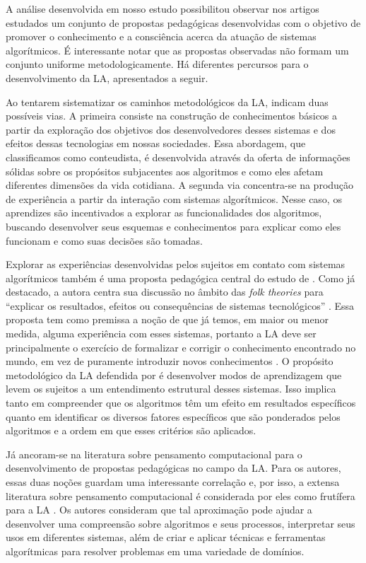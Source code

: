 A análise desenvolvida em nosso estudo possibilitou observar nos artigos
estudados um conjunto de propostas pedagógicas desenvolvidas com o
objetivo de promover o conhecimento e a consciência acerca da atuação de
sistemas algorítmicos. É interessante notar que as propostas observadas
não formam um conjunto uniforme metodologicamente. Há diferentes
percursos para o desenvolvimento da LA, apresentados a seguir.

Ao tentarem sistematizar os caminhos metodológicos da LA, \textcite{Silva2022} indicam duas possíveis vias. A primeira consiste na
construção de conhecimentos básicos a partir da exploração dos objetivos
dos desenvolvedores desses sistemas e dos efeitos dessas tecnologias em
nossas sociedades. Essa abordagem, que classificamos como conteudista, é
desenvolvida através da oferta de informações sólidas sobre os
propósitos subjacentes aos algoritmos e como eles afetam diferentes
dimensões da vida cotidiana. A segunda via concentra-se na produção de
experiência a partir da interação com sistemas algorítmicos. Nesse caso,
os aprendizes são incentivados a explorar as funcionalidades dos
algoritmos, buscando desenvolver seus esquemas e conhecimentos para
explicar como eles funcionam e como suas decisões são tomadas.

Explorar as experiências desenvolvidas pelos sujeitos em contato com
sistemas algorítmicos também é uma proposta pedagógica central do estudo
de \textcite{Devito2021}. Como já destacado, a autora centra sua discussão no
âmbito das \emph{folk theories} para ``explicar os resultados, efeitos
ou consequências de sistemas tecnológicos'' \cite[p. 4]{Devito2021}. Essa
proposta tem como premissa a noção de que já temos, em maior ou menor
medida, alguma experiência com esses sistemas, portanto a LA deve ser
principalmente o exercício de formalizar e corrigir o conhecimento
encontrado no mundo, em vez de puramente introduzir novos conhecimentos
\cite{Devito2021}. O propósito metodológico da LA defendida por \textcite{Devito2021} é desenvolver modos de aprendizagem que levem os sujeitos a um
entendimento estrutural desses sistemas. Isso implica tanto em
compreender que os algoritmos têm um efeito em resultados específicos
quanto em identificar os diversos fatores específicos que são ponderados
pelos algoritmos e a ordem em que esses critérios são aplicados.

Já \textcite{Ridley2021} ancoram-se na literatura sobre
pensamento computacional para o desenvolvimento de propostas pedagógicas
no campo da LA. Para os autores, essas duas noções guardam uma
interessante correlação e, por isso, a extensa literatura sobre
pensamento computacional é considerada por eles como frutífera para a LA
\cite{Ridley2021}. Os autores consideram que tal aproximação
pode ajudar a desenvolver uma compreensão sobre algoritmos e seus
processos, interpretar seus usos em diferentes sistemas, além de criar e
aplicar técnicas e ferramentas algorítmicas para resolver problemas em
uma variedade de domínios.

